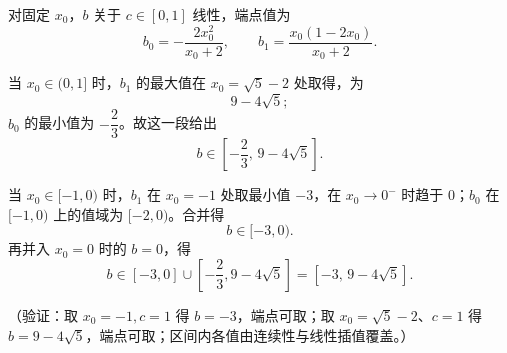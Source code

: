 \begin{answer}
对固定 \(x_0\)，\(b\) 关于 \(c\in[0,1]\) 线性，端点值为
\nopagebreak[4]
\[
b_0=-\frac{2x_0^2}{x_0+2},\qquad
b_1=\frac{x_0(1-2x_0)}{x_0+2}.
\]

当 \(x_0\in(0,1]\) 时，\(b_1\) 的最大值在 \(x_0=\sqrt5-2\) 处取得，为
\nopagebreak[4]
\[
9-4\sqrt5;
\]
\(b_0\) 的最小值为 \(-\dfrac23\)。故这一段给出
\nopagebreak[4]
\[
b\in\left[-\frac23,\,9-4\sqrt5\right].
\]

当 \(x_0\in[-1,0)\) 时，\(b_1\) 在 \(x_0=-1\) 处取最小值 \(-3\)，在 \(x_0\to0^-\) 时趋于 \(0\)；\(b_0\) 在 \([-1,0)\) 上的值域为 \([-2,0)\)。合并得
\nopagebreak[4]
\[
b\in[-3,0).
\]
再并入 \(x_0=0\) 时的 \(b=0\)，得
\nopagebreak[4]
\[
b\in[-3,0]\cup\left[-\frac23,9-4\sqrt5\right]
=[-3,\,9-4\sqrt5].
\]

（验证：取 \(x_0=-1,c=1\) 得 \(b=-3\)，端点可取；取 \(x_0=\sqrt5-2\)、\(c=1\) 得 \(b=9-4\sqrt5\)，端点可取；区间内各值由连续性与线性插值覆盖。）



\end{answer}